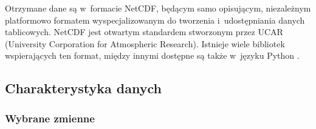 Otrzymane dane są w~formacie NetCDF, będącym samo opisującym, niezależnym platformowo formatem
wyspecjalizowanym do tworzenia i~udostępniania danych tablicowych. NetCDF jest otwartym standardem
stworzonym przez UCAR (University Corporation for Atmospheric Research). Istnieje wiele bibliotek
wspierających ten format, między innymi dostępne są także w~języku Python \cite{python}.

\subsection{Charakterystyka danych}

\subsubsection*{Wybrane zmienne}

